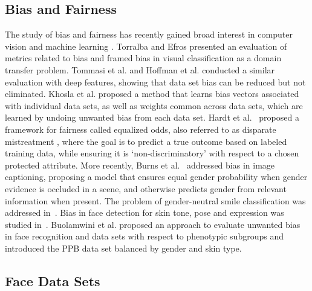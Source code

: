 \documentclass[letterpaper,11pt]{article}
\begin{document}
\subsection{Bias and Fairness} 

The study of bias and fairness has recently gained broad interest in computer vision and machine learning \cite{lohia2018bias,zhao2017men,Hendricks2018}.  
Torralba and Efros \cite{Torralba_CVPR11} presented an evaluation of metrics related to bias and framed bias in visual classification as a domain transfer problem. Tommasi et al. \cite{tommasi2017deeper} and Hoffman et al. \cite{url_arxiv_Hoffman13} conducted a similar evaluation with deep features, showing that data set bias can be reduced but not eliminated.  Khosla et al. \cite{Khosla_ECCV12} proposed a method that learns bias vectors associated with individual data sets, as well as weights common across data sets, which are learned by undoing unwanted bias from each data set. Hardt et al.~\cite{Hardt_NIPS16} proposed a framework for fairness called equalized odds, also referred to as disparate mistreatment \cite{Zafar_WWW17}, where the goal is to predict a true outcome based on labeled training data, while ensuring it is `non-discriminatory' with respect to a chosen protected attribute. More recently, Burns et al.~\cite{Hendricks2018} addressed bias in image captioning, proposing a model that ensures equal gender probability when gender evidence is occluded in a scene, and otherwise predicts gender from relevant information when present.  The problem of gender-neutral smile classification was addressed in~\cite{inclusivefacenet}.  Bias in face detection for skin tone, pose and expression was studied in~\cite{url_arxiv_McDuff18}. Buolamwini et al. \cite{gendershades_FAT18} proposed an approach to evaluate unwanted bias in face recognition and data sets with respect to phenotypic subgroups and introduced the PPB data set balanced by gender and skin type.

\subsection{Face Data Sets} 
\end{document}
